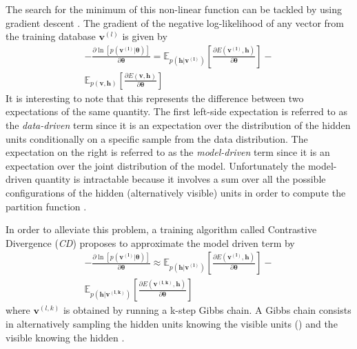 \documentclass[letterpaper]{article}
\begin{document}
The search for the minimum of this non-linear function can be tackled by using gradient descent \cite{bottou2010large}. The gradient of the negative log-likelihood of any vector from the training database $\bm{v}^{(l)}$ is given by
\begin{equation}
\label{eq:loglik}
\begin{split}
- \frac{\partial \ln \left[ p(\bm{v^{(l)}}|\bm{\theta})\right]}{\partial \bm{\theta}} 
= 
\mathbb{E}_{p(\bm{h}|\bm{v^{(l)}})} \left[ \frac{\partial E(\bm{v^{(l)}},\bm{h})}{\partial \bm{\theta}} \right] 
- \\
\mathbb{E}_{p(\bm{v} , \bm{h})} \left[ \frac{\partial E(\bm{v},\bm{h})}{\partial \bm{\theta}} \right]
\end{split}
\end{equation}
It is interesting to note that this represents the difference between two expectations of the same quantity. The first left-side expectation is referred to as the \textit{data-driven} term since it is an expectation over the distribution of the hidden units conditionally on a specific sample from the data distribution. The expectation on the right is referred to as the \textit{model-driven} term since it is an expectation over the joint distribution of the model.
Unfortunately the model-driven quantity is intractable because it involves a sum over all the possible configurations of the hidden (alternatively visible) units in order to compute the partition function \cite{Fischer2012}.

In order to alleviate this problem, a training algorithm called Contrastive Divergence (\textit{CD}) \cite{hinton2002training} proposes to approximate the model driven term by
\begin{equation}
\label{eq:grad_log_like}
\begin{split}
- \frac{\partial \ln \left[ p(\bm{v^{(l)}}|\bm{\theta})\right]}{\partial \bm{\theta}}
\approx 
\mathbb{E}_{p(\bm{h}|\bm{v^{(l)}})} \left[ \frac{\partial E(\bm{v^{(l)}},\bm{h})}{\partial \bm{\theta}} \right] 
- \\
\mathbb{E}_{p(\bm{h} | \bm{v^{(l,k)}})} \left[ \frac{\partial E(\bm{v^{(l,k)}},\bm{h})}{\partial \bm{\theta}} \right]
\end{split}
\end{equation}
where $\bm{v}^{(l,k)}$ is obtained by running a k-step Gibbs chain. A Gibbs chain consists in alternatively sampling the hidden units knowing the visible units () and the visible knowing the hidden .
\end{document}
